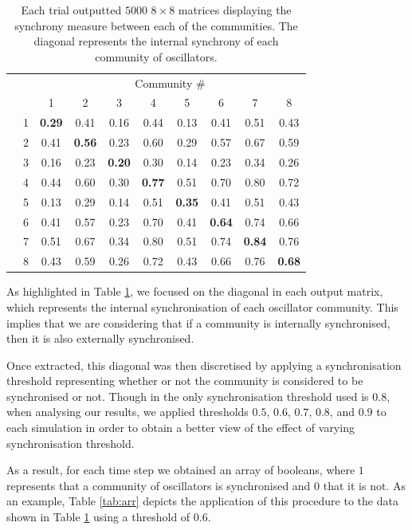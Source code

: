 \documentclass[a4paper,11pt]{article}
\begin{document}
\begin{table}[ht]
\centering

\begin{tabular}{c l | c c c c c c c c}

& & \multicolumn{8}{c}{Community \#} \\ [2mm]
& & 1 & 2 & 3 & 4 & 5 & 6 & 7 & 8 \\
\hline
\parbox[t]{2mm}{}
& 1 & \textbf{0.29} & 0.41 & 0.16 & 0.44 & 0.13 & 0.41 & 0.51 & 0.43 \\
& 2 & 0.41 & \textbf{0.56} & 0.23 & 0.60 & 0.29 & 0.57 & 0.67 & 0.59 \\
& 3 & 0.16 & 0.23 & \textbf{0.20} & 0.30 & 0.14 & 0.23 & 0.34 & 0.26 \\
& 4 & 0.44 & 0.60 & 0.30 & \textbf{0.77} & 0.51 & 0.70 & 0.80 & 0.72 \\
& 5 & 0.13 & 0.29 & 0.14 & 0.51 & \textbf{0.35} & 0.41 & 0.51 & 0.43 \\
& 6 & 0.41 & 0.57 & 0.23 & 0.70 & 0.41 & \textbf{0.64} & 0.74 & 0.66 \\
& 7 & 0.51 & 0.67 & 0.34 & 0.80 & 0.51 & 0.74 & \textbf{0.84} & 0.76 \\
& 8 & 0.43 & 0.59 & 0.26 & 0.72 & 0.43 & 0.66 & 0.76 & \textbf{0.68} \\
\end{tabular}
\caption{Each trial outputted $5000$ $8 \times 8$ matrices displaying the synchrony measure between each of the communities. The diagonal represents the internal synchrony of each community of oscillators. \label{tab:mat}}
\end{table}

As highlighted in Table \ref{tab:mat}, we focused on the diagonal in each output matrix, which represents the internal synchronisation of each oscillator community. This implies that we are considering that if a community is internally synchronised, then it is also externally synchronised.

Once extracted, this diagonal was then discretised by applying a synchronisation threshold representing whether or not the community is considered to be synchronised or not. Though in \cite{Shanahan2010} the only synchronisation threshold used is $0.8$, when analysing our results, we applied thresholds $0.5$, $0.6$, $0.7$, $0.8$, and $0.9$ to each simulation in order to obtain a better view of the effect of varying synchronisation threshold.

As a result, for each time step we obtained an array of booleans, where $1$ represents that a community of oscillators is synchronised and $0$ that it is not. As an example, Table \ref{tab:arr} depicts the application of this procedure to the data shown in Table \ref{tab:mat} using a threshold of $0.6$.
\end{document}
